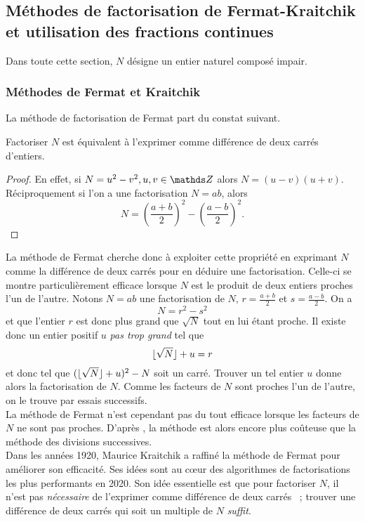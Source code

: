 \subsection{Méthodes de factorisation de Fermat-Kraitchik et utilisation des
fractions continues}

Dans toute cette section, $N$ désigne un entier naturel composé impair.

\subsubsection{Méthodes de Fermat et Kraitchik}

La méthode de factorisation de Fermat part du constat suivant.

\begin{lemme}
	Factoriser $N$ est équivalent à l'exprimer comme différence de deux carrés
	d'entiers.
\end{lemme}

\begin{proof}
	En effet, si $N = u^2 - v^2, u, v\in \Z$ alors $N = (u-v)(u + v)$.
	Réciproquement si l'on a une factorisation $N = ab$, alors \[N =
	\left(\frac{a+b}{2}\right)^2 - \left(\frac{a-b}{2}\right)^2.\]
\end{proof}

La méthode de Fermat cherche donc à exploiter cette propriété en exprimant $N$
comme la différence de deux carrés pour en déduire une factorisation. Celle-ci se
montre particulièrement efficace lorsque $N$ est le produit de deux entiers
proches l'un de l'autre. Notons $N=ab$ une factorisation de $N$,
$r=\frac{a+b}{2}$ et $s=\frac{a-b}{2}$. On a \[N = r^2 - s^2\] et que l'entier
$r$ est donc plus grand que $\sqrt{N}$ tout en lui étant proche. Il existe donc
un entier positif $u$ \emph{pas trop grand} tel que \[\lfloor\sqrt{N}\rfloor + u = r\]
et donc tel que $(\lfloor\sqrt{N}\rfloor + u)^2 - N$ soit un carré. Trouver un tel
entier $u$ donne alors la factorisation de $N$. Comme les facteurs de $N$ sont
proches l'un de l'autre, on le trouve par essais successifs. \\

La méthode de Fermat n'est cependant pas du tout efficace lorsque les facteurs
de $N$ ne sont pas proches. D'après , la méthode est alors encore plus
coûteuse que la méthode des divisions successives. \\

Dans les années 1920, Maurice Kraitchik a raffiné la méthode de Fermat pour
améliorer son efficacité. Ses idées sont au cœur des algorithmes de
factorisations les plus performants en 2020. Son idée essentielle est que pour
factoriser $N$, il n'est pas \emph{nécessaire} de l'exprimer comme différence
de deux carrés ~; trouver une différence de deux carrés qui soit un multiple de
$N$ \emph{suffit}.

